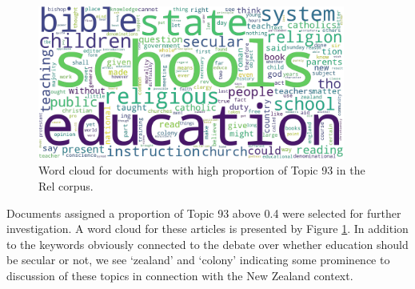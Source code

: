 \documentclass{article}
\begin{document}
\begin{figure}
  \centering
  \includegraphics[width=0.9\textwidth]{images/topic93.png}
  \caption{Word cloud for documents with high proportion of Topic 93 in the Rel corpus.}
  \label{f:wc-t93}
\end{figure}

Documents assigned a proportion of Topic 93 above 0.4 were selected for further investigation. A word cloud for these articles is presented by Figure \ref{f:wc-t93}. In addition to the keywords obviously connected to the debate over whether education should be secular or not, we see `zealand' and `colony' indicating some prominence to discussion of these topics in connection with the New Zealand context.
\end{document}
